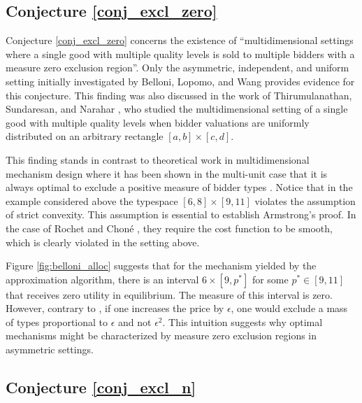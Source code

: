 \subsection{Conjecture \ref{conj_excl_zero}}

Conjecture \ref{conj_excl_zero} concerns the existence of ``multidimensional settings where a single good with multiple quality levels is sold to multiple bidders with a measure zero exclusion region''. Only the asymmetric, independent, and uniform setting initially investigated by Belloni, Lopomo, and Wang \autocite*{belloni2010multidimensional} provides evidence for this conjecture. This finding was also discussed in the work of Thirumulanathan, Sundaresan, and Narahar \autocite*{thirumulanathan2019unitdemand}, who studied the multidimensional setting of a single good with multiple quality levels when bidder valuations are uniformly distributed on an arbitrary rectangle $[a,b] \times [c,d]$. 

This finding stands in contrast to theoretical work in multidimensional mechanism design where it has been shown in the multi-unit case that it is always optimal to exclude a positive measure of bidder types \autocite{armstrong1996multiproduct,rochet1998ironing}. Notice that in the example considered above the typespace $[6,8]\times[9,11]$ violates the assumption of strict convexity. This assumption is essential to establish Armstrong's \autocite*{armstrong1996multiproduct} proof. In the case of Rochet and Choné \autocite*{rochet1998ironing}, they require the cost function to be smooth, which is clearly violated in the setting above.

Figure \ref{fig:belloni_alloc} suggests that for the mechanism yielded by the approximation algorithm, there is an interval $6\times [9,p^*]$ for some $p^*\in [9,11]$ that receives zero utility in equilibrium. The measure of this interval is zero. However, contrary to \autocite[Proposition 1]{armstrong1996multiproduct}, if one increases the price by $\epsilon$, one would exclude a mass of types proportional to $\epsilon$ and not $\epsilon^2$. This intuition suggests why optimal mechanisms might be characterized by measure zero exclusion regions in asymmetric settings. 





\subsection{Conjecture \ref{conj_excl_n}}

